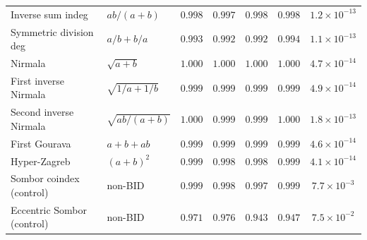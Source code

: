 \begin{table}[h]
\begin{tabular}{llccccc}
Inverse sum indeg~\cite{VukicevicGasperov2010Adriatic} & $ab/(a+b)$ & $0.998$ & $0.997$ & $0.998$ & $0.998$ & $1.2\times10^{-13}$\\
Symmetric division deg~\cite{VukicevicGasperov2010Adriatic} & $a/b+b/a$ & $0.993$ & $0.992$ & $0.992$ & $0.994$ & $1.1\times10^{-13}$\\
Nirmala~\cite{Kulli2021Nirmala} & $\sqrt{a+b}$ & $1.000$ & $1.000$ & $1.000$ & $1.000$ & $4.7\times10^{-14}$\\
First inverse Nirmala~\cite{KulliLokeshaNirupadi2021InvNirmala} & $\sqrt{1/a+1/b}$ & $0.999$ & $0.999$ & $0.999$ & $0.999$ & $4.9\times10^{-14}$\\
Second inverse Nirmala~\cite{KulliLokeshaNirupadi2021InvNirmala} & $\sqrt{ab/(a+b)}$ & $1.000$ & $0.999$ & $0.999$ & $1.000$ & $1.8\times10^{-13}$\\
First Gourava~\cite{Kulli2017Gourava} & $a+b+ab$ & $0.999$ & $0.999$ & $0.999$ & $0.999$ & $4.6\times10^{-14}$\\
Hyper-Zagreb~\cite{ShirdelRezapourSayadi2013HyperZagreb} & $(a+b)^2$ & $0.999$ & $0.998$ & $0.998$ & $0.999$ & $4.1\times10^{-14}$\\
\midrule
Sombor coindex (control) & non-BID & $0.999$ & $0.998$ & $0.997$ & $0.999$ & $7.7\times10^{-3}$\\
Eccentric Sombor (control) & non-BID & $0.971$ & $0.976$ & $0.943$ & $0.947$ & $7.5\times10^{-2}$\\
\bottomrule
\end{tabular}
\end{table}
